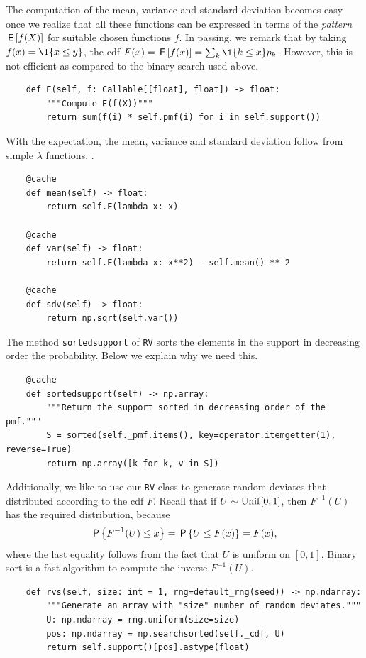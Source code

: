 \documentclass[queueing-book]{subfiles}
\begin{document}
The computation of the mean, variance and standard deviation becomes easy once we realize that all these functions can be expressed in terms of the \emph{pattern} \(\E{f(X)}\) for suitable chosen functions \(f\).
In passing, we remark that by taking \(f(x) = \1{x\leq y}\), the cdf \(F(x) = \E{f(x)} = \sum_{k} \1{k \leq x} p_{k}\).
However, this is not efficient as compared to the binary search used above.
\begin{verbatim}
    def E(self, f: Callable[[float], float]) -> float:
        """Compute E(f(X))"""
        return sum(f(i) * self.pmf(i) for i in self.support())
\end{verbatim}

With the expectation, the mean, variance and standard deviation follow from simple \(\lambda\) functions. .
\begin{verbatim}
    @cache
    def mean(self) -> float:
        return self.E(lambda x: x)

    @cache
    def var(self) -> float:
        return self.E(lambda x: x**2) - self.mean() ** 2

    @cache
    def sdv(self) -> float:
        return np.sqrt(self.var())
\end{verbatim}

The method \texttt{sortedsupport} of \texttt{RV} sorts the elements in the support in decreasing order the probability. Below we explain why we need this.
\begin{verbatim}
    @cache
    def sortedsupport(self) -> np.array:
        """Return the support sorted in decreasing order of the pmf."""
        S = sorted(self._pmf.items(), key=operator.itemgetter(1), reverse=True)
        return np.array([k for k, v in S])
\end{verbatim}


Additionally, we like to use our \texttt{RV} class to generate random deviates that distributed according to the cdf \(F\).
Recall that if \(U\sim \Unif{[0,1]}\), then \(F^{-1}(U)\) has the required distribution, because
\begin{equation*}
\P{F^{-1}(U) \leq x} = \P{U \leq F(x)} = F(x),
\end{equation*}
where the last equality follows from the fact that \(U\) is uniform on \([0,1]\).
Binary sort is a fast algorithm to compute the inverse \(F^{-1}(U)\).
\begin{verbatim}
    def rvs(self, size: int = 1, rng=default_rng(seed)) -> np.ndarray:
        """Generate an array with "size" number of random deviates."""
        U: np.ndarray = rng.uniform(size=size)
        pos: np.ndarray = np.searchsorted(self._cdf, U)
        return self.support()[pos].astype(float)
\end{verbatim}
\end{document}
